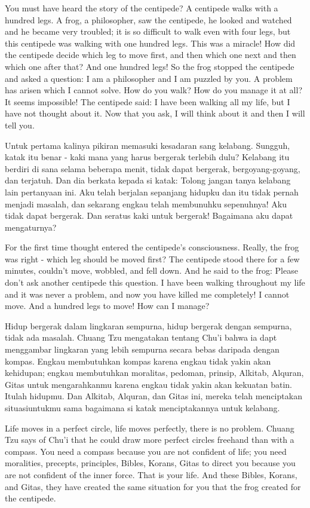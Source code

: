 \english
You must have heard the story of the centipede? A centipede walks with a hundred legs. A frog, a philosopher, saw the centipede, he looked and watched and he became very troubled; it is so difficult to walk even with four legs, but this centipede was walking with one hundred legs. This was a miracle! How did the centipede decide which leg to move first, and then which one next and then which one after that? And one hundred legs! So the frog stopped the centipede and asked a question: I am a philosopher and I am puzzled by you. A problem has arisen which I cannot solve. How do you walk? How do you manage it at all? It seems impossible! The centipede said: I have been walking all my life, but I have not thought about it. Now that you ask, I will think about it and then I will tell you.

\bahasa
Untuk pertama kalinya pikiran memasuki kesadaran sang kelabang. Sungguh, katak itu benar - kaki mana yang harus bergerak terlebih dulu? Kelabang itu berdiri di sana selama beberapa menit, tidak dapat bergerak, bergoyang-goyang, dan terjatuh. Dan dia berkata kepada si katak: Tolong jangan tanya kelabang lain pertanyaan ini. Aku telah berjalan sepanjang hidupku dan itu tidak pernah menjadi masalah, dan sekarang engkau telah membunuhku sepenuhnya! Aku tidak dapat bergerak. Dan seratus kaki untuk bergerak! Bagaimana aku dapat mengaturnya?

\english
For the first time thought entered the centipede's consciousness. Really, the frog was right - which leg should be moved first? The centipede stood there for a few minutes, couldn’t move, wobbled, and fell down. And he said to the frog: Please don't ask another centipede this question. I have been walking throughout my life and it was never a problem, and now you have killed me completely! I cannot move. And a hundred legs to move! How can I manage?

\bahasa
Hidup bergerak dalam lingkaran sempurna, hidup bergerak dengan sempurna, tidak ada masalah. Chuang Tzu mengatakan tentang Chu'i bahwa ia dapt menggambar lingkaran yang lebih sempurna secara bebas daripada dengan kompas. Engkau membutuhkan kompas karena engkau tidak yakin akan kehidupan; engkau membutuhkan moralitas, pedoman, prinsip, Alkitab, Alquran, Gitas untuk mengarahkanmu karena engkau tidak yakin akan kekuatan batin. Itulah hidupmu. Dan Alkitab, Alquran, dan Gitas ini, mereka telah menciptakan situasiuntukmu sama bagaimana si katak menciptakannya untuk kelabang.

\english
Life moves in a perfect circle, life moves perfectly, there is no problem. Chuang Tzu says of Chu'i that he could draw more perfect circles freehand than with a compass. You need a compass because you are not confident of life; you need moralities, precepts, principles, Bibles, Korans, Gitas to direct you because you are not confident of the inner force. That is your life. And these Bibles, Korans, and Gitas, they have created the same situation for you that the frog created for the centipede.

